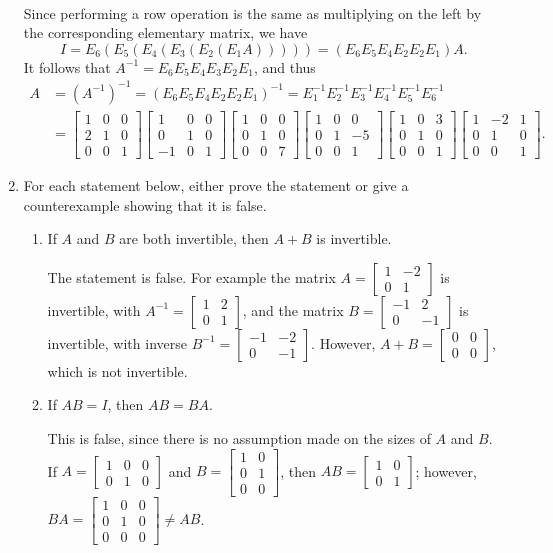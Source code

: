 \documentclass[letterpaper,12pt]{article}
\newcommand{\bbm}{\begin{bmatrix}}
\newcommand{\ebm}{\end{bmatrix}}
\begin{document}
\begin{enumerate}
\begin{align*}
\end{align*}
Since performing a row operation is the same as multiplying on the left by the corresponding elementary matrix, we have
\[
 I = E_6(E_5(E_4(E_3(E_2(E_1A))))) = (E_6E_5E_4E_2E_2E_1)A.
\]
It follows that $A^{-1} = E_6E_5E_4E_3E_2E_1$, and thus
\begin{align*}
 A & = (A^{-1})^{-1} = (E_6E_5E_4E_2E_2E_1)^{-1} = E_1^{-1}E_2^{-1}E_3^{-1}E_4^{-1}E_5^{-1}E_6^{-1}\\
   & = \bbm 1&0&0\\2&1&0\\0&0&1\ebm \bbm 1&0&0\\0&1&0\\-1&0&1\ebm \bbm 1&0&0\\0&1&0\\0&0&7\ebm \bbm 1&0&0\\0&1&-5\\0&0&1\ebm \bbm 1&0&3\\0&1&0\\0&0&1\ebm \bbm 1&-2&1\\0&1&0\\0&0&1\ebm.
\end{align*}

\bigskip


\item For each statement below, either prove the statement or give a counterexample showing that it is false.
\begin{enumerate}
 \item If $A$ and $B$ are both invertible, then $A+B$ is invertible.

\medskip

The statement is false. For example the matrix $A=\bbm 1&-2\\0&1\ebm$ is invertible, with $A^{-1} = \bbm 1&2\\0&1\ebm$, and the matrix $B = \bbm -1&2\\0&-1\ebm$ is invertible, with inverse $B^{-1} = \bbm -1&-2\\0&-1\ebm$. However, $A+B = \bbm 0&0\\0&0\ebm$, which is not invertible.

\medskip

 \item If $AB=I$, then $AB=BA$.

\medskip

This is false, since there is no assumption made on the sizes of $A$ and $B$. If $A = \bbm 1&0&0\\0&1&0\ebm$ and $B = \bbm 1&0\\0&1\\0&0\ebm$, then $AB = \bbm 1&0\\0&1\ebm$; however, $BA = \bbm 1&0&0\\0&1&0\\0&0&0\ebm \neq AB$.


\end{enumerate}
\end{enumerate}
\end{document}
